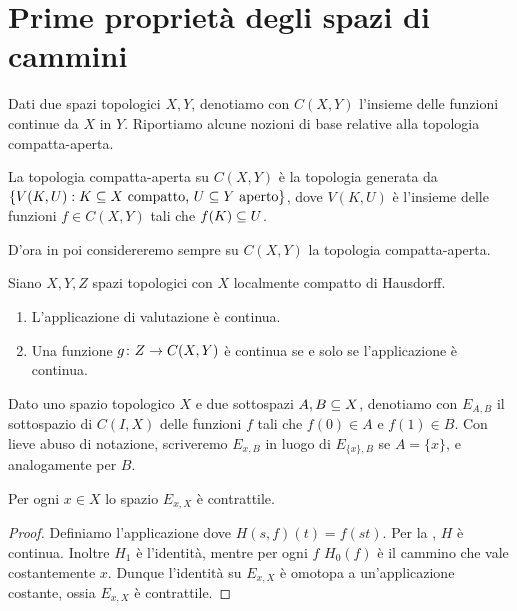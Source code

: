 \section{Prime proprietà degli spazi di cammini}
Dati due spazi topologici $X,Y$, denotiamo con $C(X,Y)$ l'insieme delle funzioni continue da $X$ in $Y$. Riportiamo alcune nozioni di base relative alla topologia compatta-aperta.
\begin{definition}
La topologia compatta-aperta su $C(X,Y)$ è la topologia generata da $\{V(K,U):\text{$K\subseteq X$ compatto, $U\subseteq Y$ aperto}\}$, dove $V(K,U)$ è l'insieme delle funzioni $f\in C(X,Y)$ tali che $f(K)\subseteq U$.
\end{definition}
D'ora in poi considereremo sempre su $C(X,Y)$ la topologia compatta-aperta.
\begin{proposition}
Siano $X,Y,Z$ spazi topologici con $X$ localmente compatto di Hausdorff.
\begin{enumerate}
\item L'applicazione di valutazione
è continua.
\item Una funzione $g\colon Z\to C(X,Y)$ è continua se e solo se l'applicazione
è continua.
\end{enumerate}
\end{proposition}

Dato uno spazio topologico $X$ e due sottospazi $A,B\subseteq X$, denotiamo con $E_{A,B}$ il sottospazio di $C(I,X)$ delle funzioni $f$ tali che $f(0)\in A$ e $f(1)\in B$. Con lieve abuso di notazione, scriveremo $E_{x,B}$ in luogo di $E_{\{x\},B}$ se $A=\{x\}$, e analogamente per $B$.

\begin{proposition}
Per ogni $x\in X$ lo spazio $E_{x,X}$ è contrattile.
\end{proposition}
\begin{proof}
Definiamo l'applicazione
dove $H(s,f)(t)=f(st)$. Per la , $H$ è continua. Inoltre $H_1$ è l'identità, mentre per ogni $f$ $H_0(f)$ è il cammino che vale costantemente $x$. Dunque l'identità su $E_{x,X}$ è omotopa a un'applicazione costante, ossia $E_{x,X}$ è contrattile.
\end{proof}

